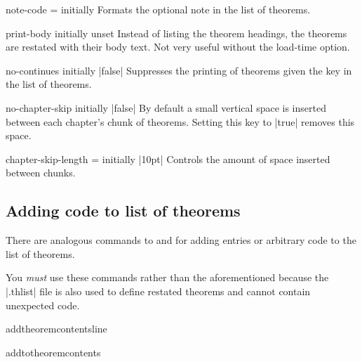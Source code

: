 \documentclass{ltxdoc}
\newcommand{\ttbraces}[1]{\braces{\texttt{#1}}}
\begin{document}
\begin{docKey}{note-code}
  {=}
  {initially \ttbraces{ (\#1)}}
Formats the optional note in the list of theorems.
\end{docKey}

\begin{docKey}{print-body}
  {}
  {initially unset}
Instead of listing the theorem headings, the theorems are restated with their body text. Not very useful without the  load-time option.
\end{docKey}

\begin{docKey}{no-continues}
  {}
  {initially |false|}
Suppresses the printing of theorems given the  key in the list of theorems.
\end{docKey}

\begin{docKey}{no-chapter-skip}
  {}
  {initially |false|}
By default a small vertical space is inserted between each chapter's chunk of theorems. Setting this key to |true| removes this space.
\end{docKey}

\begin{docKey}{chapter-skip-length}
  {=}
  {initially |10pt|}
Controls the amount of space inserted between chunks.
\end{docKey}

\subsection{Adding code to list of theorems}

There are analogous commands to  and  for
adding entries or arbitrary code to the list of theorems.

\begin{notebox}
You \emph{must} use these commands rather than the aforementioned because the
|.thlist| file is also used to define restated theorems and cannot contain
unexpected code.
\end{notebox}

\begin{docCommand}{addtheoremcontentsline}
  {}

\end{docCommand}

\begin{docCommand}{addtotheoremcontents}
  {}

\end{docCommand}
\end{document}
